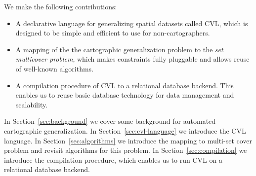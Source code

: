 We make the following contributions:

\begin{itemize}
\item A declarative language for generalizing spatial datasets called CVL, which is designed to be simple and efficient to use for non-cartographers. 
\item A mapping of the the cartographic generalization problem to the \emph{set multicover problem}, which makes constraints fully pluggable and allows reuse of well-known algorithms.
\item A compilation procedure of CVL to a relational database backend. This enables us to reuse basic database technology for data management and scalability.
\end{itemize}

In Section~\ref{sec:background} we cover some background for automated cartographic generalization. In Section~\ref{sec:cvl-language} we introduce the CVL language. In Section~\ref{sec:algorithms} we introduce the mapping to multi-set cover problem and revisit algorithms for this problem. In Section~\ref{sec:compilation} we introduce the compilation procedure, which enables us to run CVL on a relational database backend.